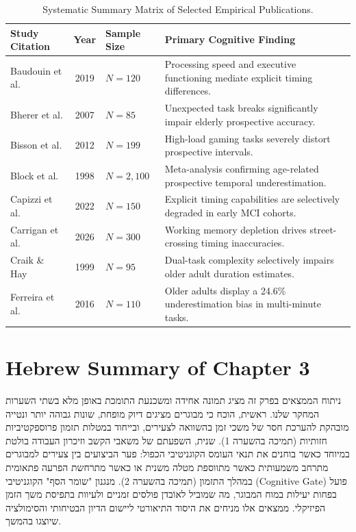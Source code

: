 \documentclass{custom_report}
\begin{document}
\begin{table}[htbp]
\centering
\small
\begin{tabular}{|p{3cm}|c|p{2.5cm}|p{6cm}|}
\hline
\textbf{Study Citation} & \textbf{Year} & \textbf{Sample Size} & \textbf{Primary Cognitive Finding} \\ \hline
Baudouin et al. & 2019 & $N = 120$ & Processing speed and executive functioning mediate explicit timing differences. \\ \hline
Bherer et al. & 2007 & $N = 85$ & Unexpected task breaks significantly impair elderly prospective accuracy. \\ \hline
Bisson et al. & 2012 & $N = 199$ & High-load gaming tasks severely distort prospective intervals. \\ \hline
Block et al. & 1998 & $N = 2,100$ & Meta-analysis confirming age-related prospective temporal underestimation. \\ \hline
Capizzi et al. & 2022 & $N = 150$ & Explicit timing capabilities are selectively degraded in early MCI cohorts. \\ \hline
Carrigan et al. & 2026 & $N = 300$ & Working memory depletion drives street-crossing timing inaccuracies. \\ \hline
Craik \& Hay & 1999 & $N = 95$ & Dual-task complexity selectively impairs older adult duration estimates. \\ \hline
Ferreira et al. & 2016 & $N = 110$ & Older adults display a 24.6\% underestimation bias in multi-minute tasks. \\ \hline
\end{tabular}
\caption{Systematic Summary Matrix of Selected Empirical Publications.}
\label{tab:primary_matrix}
\end{table}

\clearpage

\section{Hebrew Summary of Chapter 3}
ניתוח הממצאים בפרק זה מציג תמונה אחידה ומשכנעת התומכת באופן מלא בשתי השערות המחקר שלנו. ראשית, הוכח כי מבוגרים מציגים דיוק מופחת, שונות גבוהה יותר ונטייה מובהקת להערכת חסר של משכי זמן בהשוואה לצעירים, ובייחוד במטלות תזמון פרוספקטיביות חזותיות (תמיכה בהשערה 1). שנית, השפעתם של משאבי הקשב וזיכרון העבודה בולטת במיוחד כאשר בוחנים את תנאי העומס הקוגניטיבי הכפול: פער הביצועים בין צעירים למבוגרים מתרחב משמעותית כאשר מתווספת מטלה משנית או כאשר מתרחשת הפרעה פתאומית במהלך התזמון (תמיכה בהשערה 2). מנגנון "שומר הסף" הקוגניטיבי (Cognitive Gate) פועל בפחות יעילות במוח המבוגר, מה שמוביל לאוֹבדן פולסים זמניים ולעיוות בתפיסת משך הזמן הפיזיקלי. ממצאים אלו מניחים את היסוד התיאורטי ליישום הדיון הבטיחותי והסימולציה שיוצגו בהמשך.
\end{document}

